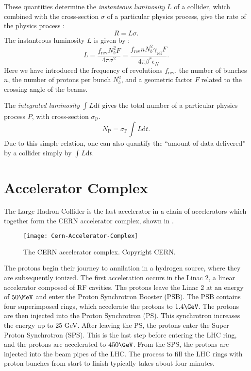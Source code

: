 These quantities determine the \textit{instanteous luminosity} $L$ of a collider, which combined with the cross-section $\sigma$ of a particular physics process, give the rate of the physics process :
\begin{equation} \label{eq:rate}
R = L \sigma.
\end{equation}
The instanteous luminosity $L$ is given by :
\begin{equation}\label{eq:insta_lumi}
L = \frac{f_{\text{rev}} N_b^2 F}{4 \pi \sigma^2}= \frac{f_{\text{rev}} n N_b^2 \gamma_{\text{rel}} F }{ 4\pi \beta^* \epsilon_N}.
\end{equation}
Here we have introduced the frequency of revolutions $f_{\text{rev}}$, the number of bunches $n$, the number of protons per bunch $N_b^2$, and a geometric factor $F$ related to the crossing angle of the beams.

The \textit{integrated luminosity} $\int_{}^{} L \mathrm{d}t$ gives the total number of a particular physics process $P$, with cross-section $\sigma_{\text{P}}$.
\begin{equation}
N_{\text{P}} = \sigma_{\text{P}} \int_{}^{} L \mathrm{d}t.
\end{equation}
Due to this simple relation, one can also quantify the ``amount of data delivered'' by a collider simply by $\int_{}^{} L \mathrm{d}t$.

\section{Accelerator Complex}

The Large Hadron Collider is the last accelerator in a chain of accelerators which together form the CERN accelerator complex, shown in .
\begin{figure}
\caption{The CERN accelerator complex. Copyright CERN.}\label{fig:accelerator_complex}
\texttt{[image: Cern-Accelerator-Complex]}
\end{figure}
The protons begin their journey to annilation in a hydrogen source, where they are subsequently ionized.
The first acceleration occurs in the Linac 2, a linear accelerator composed of RF cavities.
The protons leave the Linac 2 at an energy of $50 \MeV$ and enter the Proton Synchrotron Booster (PSB).
The PSB contains four superimposed rings, which accelerate the protons to $1.4 \GeV$.
The protons are then injected into the Proton Synchrotron (PS).
This synchrotron increases the energy up to 25 GeV.
After leaving the PS, the protons enter the Super Proton Synchrotron (SPS).
This is the last step before entering the LHC ring, and the protons are accelerated to $450 \GeV$.
From the SPS, the protons are injected into the beam pipes of the LHC.
The process to fill the LHC rings with proton bunches from start to finish typically takes about four minutes.

